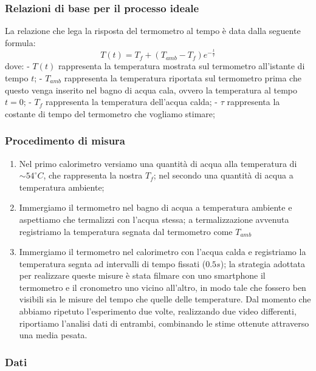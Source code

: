 \documentclass[11pt]{article}
\providecommand{\tightlist}{%
      \setlength{\itemsep}{0pt}\setlength{\parskip}{0pt}}
\begin{document}
\hypertarget{relazioni-di-base-per-il-processo-ideale}{%
\subsubsection{Relazioni di base per il processo
ideale}\label{relazioni-di-base-per-il-processo-ideale}}

La relazione che lega la risposta del termometro al tempo è data dalla
seguente formula: \[T(t)=T_{f}+(T_{amb}-T_{f} )e ^{-\frac{t}{\tau}}\]
dove: - \(T(t)\) rappresenta la temperatura mostrata sul termometro
all'istante di tempo \(t\); - \(T_{amb}\) rappresenta la temperatura
riportata sul termometro prima che questo venga inserito nel bagno di
acqua cala, ovvero la temperatura al tempo \(t=0\); - \(T_{f}\)
rappresenta la temperatura dell'acqua calda; - \(\tau\) rappresenta la
costante di tempo del termometro che vogliamo stimare;

\hypertarget{procedimento-di-misura}{%
\subsubsection{Procedimento di misura}\label{procedimento-di-misura}}

\begin{enumerate}
\def\labelenumi{\arabic{enumi}.}
\tightlist
\item
  Nel primo calorimetro versiamo una quantità di acqua alla temperatura
  di \(\sim 54^\circ C\), che rappresenta la nostra \(T_{f}\); nel
  secondo una quantità di acqua a temperatura ambiente;
\item
  Immergiamo il termometro nel bagno di acqua a temperatura ambiente e
  aspettiamo che termalizzi con l'acqua stessa; a termalizzazione
  avvenuta registriamo la temperatura segnata dal termometro come
  \(T_{amb}\)
\item
  Immergiamo il termometro nel calorimetro con l'acqua calda e
  registriamo la temperatura segnta ad intervalli di tempo fissati
  (\(0.5s\)); la strategia adottata per realizzare queste misure è stata
  filmare con uno smartphone il termometro e il cronometro uno vicino
  all'altro, in modo tale che fossero ben visibili sia le misure del
  tempo che quelle delle temperature. Dal momento che abbiamo ripetuto
  l'esperimento due volte, realizzando due video differenti, riportiamo
  l'analisi dati di entrambi, combinando le stime ottenute attraverso
  una media pesata.
\end{enumerate}

\hypertarget{dati}{%
\subsubsection{Dati}\label{dati}}
\end{document}

